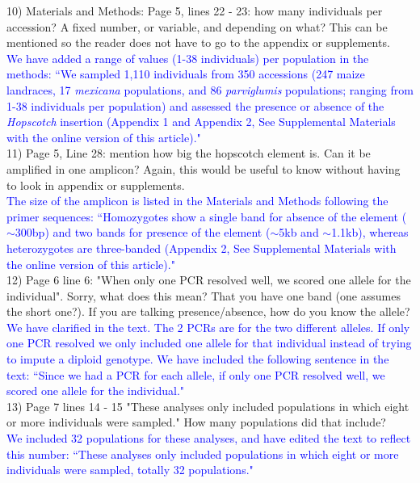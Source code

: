 \documentclass[11pt]{article}
\newcommand{\res}[1]{\noindent \textcolor{blue}{{#1}} \\}
\begin{document}
10) Materials and Methods:
Page 5, lines 22 - 23: how many individuals per accession? A fixed number, or variable, and depending on what? This can be mentioned so the reader does not have to go to the appendix or supplements.\\ 

\res{We have added a range of values (1-38 individuals) per population in the methods: ``We sampled 1,110 individuals from 350 accessions (247 maize landraces, 17 \emph{mexicana} populations, and 86 \emph{parviglumis} populations; ranging from 1-38 individuals per population) and assessed the presence or absence of the \emph{Hopscotch} insertion (Appendix 1 and Appendix 2, See Supplemental Materials with the online version of this article)."}

11) Page 5, Line 28: mention how big the hopscotch element is.  Can it be amplified in one amplicon? Again, this would be useful to know without having to look in appendix or supplements.\\

\res{The size of the amplicon is listed in the Materials and Methods following the primer sequences: ``Homozygotes show a single band for absence of the element ($\sim$300bp) and two bands for presence of the element ($\sim$5kb and $\sim$1.1kb), whereas heterozygotes are three-banded (Appendix 2, See Supplemental Materials with the online version of this article)."}

12) Page 6 line 6: "When only one PCR resolved well, we scored one allele for the individual".  Sorry, what does this mean? That you have one band (one assumes the short one?). If you are talking presence/absence, how do you know the allele?\\ 

\res{We have clarified in the text. The 2 PCRs are for the two different alleles. If only one PCR resolved we only included one allele for that individual instead of trying to impute a diploid genotype. We have included the following sentence in the text: ``Since we had a PCR for each allele, if only one PCR resolved well, we scored one allele for the individual."}

13) Page 7 lines 14 - 15 "These analyses only included populations in which eight or more individuals were sampled."  How many populations did that include?\\
 
\res{We included 32 populations for these analyses, and have edited the text to reflect this number: ``These analyses only included populations in which eight or more individuals were sampled, totally 32 populations."}
\end{document}
